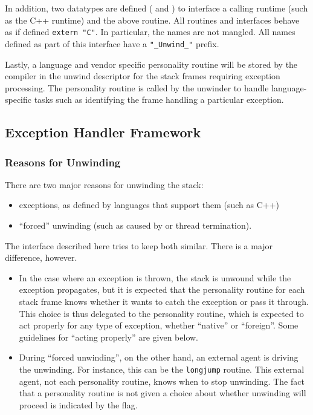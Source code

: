 In addition, two datatypes are defined (
and ) to interface a calling runtime
(such as the C++ runtime) and the above routine. All routines and
interfaces behave as if defined \texttt{extern "C"}. In particular,
the names are not mangled. All names defined as part of this interface
have a \texttt{"\_Unwind\_"} prefix.

Lastly, a language and vendor specific personality routine will be
stored by the compiler in the unwind descriptor for the stack frames
requiring exception processing. The personality routine is called by
the unwinder to handle language-specific tasks such as identifying the
frame handling a particular exception.

\subsection{Exception Handler Framework} 

\subsubsection{Reasons for Unwinding}
There are two major reasons for unwinding the stack:
\begin{itemize}
  \item exceptions, as defined by languages that support them (such as C++)
  \item ``forced'' unwinding (such as caused by  or thread
    termination).
\end{itemize}

The interface described here tries to keep both similar. There is a
major difference, however.
\begin{itemize}

\item In the case where an exception is thrown, the stack is unwound
while the exception propagates, but it is expected that the personality
routine for each stack frame knows whether it wants to catch the exception
or pass it through. This choice is thus delegated to the personality
routine, which is expected to act properly for any type of exception,
whether ``native'' or ``foreign''.  Some guidelines for ``acting properly''
are given below.

\item During ``forced unwinding'', on the other hand, an external agent is
driving the unwinding. For instance, this can be the \texttt{longjump}
routine. This external agent, not each personality routine,
knows when to stop unwinding. The fact that a personality routine is
not given a choice about whether unwinding will proceed is indicated by the
 flag.
\end{itemize}

